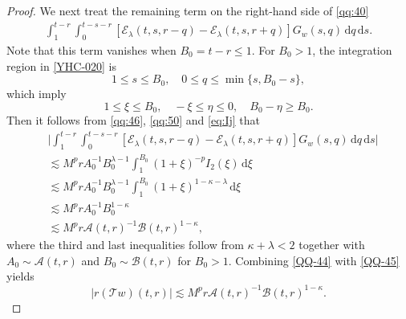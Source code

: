 \documentclass[10pt,a4paper]{amsart}
\newcommand{\Acal}{\mathcal A}
\newcommand{\Bcal}{\mathcal B}
\newcommand{\Ecal}{\mathcal E}
\newcommand{\Tcal}{\mathcal T}
\newcommand{\dd}{\,\mathrm{d}}
\begin{document}
\begin{proof}
We next treat the remaining term on the right-hand side of
\eqref{qq:40}
\begin{equation}\label{YHC-020}
\begin{aligned}
\int_1^{t-r}
\int_0^{t-s-r}
\left[
\Ecal_\lambda(t,s,r-q)
-
\Ecal_\lambda(t,s,r+q)
\right]
G_w(s,q)\dd q\dd s.
\end{aligned}
\end{equation}
Note that this term vanishes when $B_0=t-r\leq1$. For $B_0>1$, the
integration region in \eqref{YHC-020} is
\[
1\leq s\leq B_0,
\quad
0\leq q\leq\min\{s,B_0-s\},
\]
which  imply
\[
1\leq\xi\leq B_0,
\quad
-\xi\leq\eta\leq0,\quad B_0-\eta\geq B_0.
\]
Then it follows from \eqref{qq:46},
\eqref{qq:50} and \eqref{eq:Ij} that
\begin{equation}\label{QQ-45}
\begin{aligned}
&\big|
\int_1^{t-r}
\int_0^{t-s-r}
\left[
\Ecal_\lambda(t,s,r-q)
-
\Ecal_\lambda(t,s,r+q)
\right]
G_w(s,q)\dd q\dd s
\big|\\
&\lesssim
M^p rA_0^{-1}B_0^{\lambda-1}
\int_1^{B_0}
(1+\xi)^{-p}I_2(\xi)\dd\xi\\
&\lesssim
M^p rA_0^{-1}B_0^{\lambda-1}
\int_1^{B_0}
(1+\xi)^{1-\kappa-\lambda}\dd\xi\\
&\lesssim
M^p rA_0^{-1}B_0^{1-\kappa}\\
&\lesssim
M^p r
\Acal(t,r)^{-1}
\Bcal(t,r)^{1-\kappa},
\end{aligned}
\end{equation}
where the third and last inequalities follow from
$\kappa+\lambda<2$ together with
$A_0\sim\Acal(t,r)$ and $B_0\sim\Bcal(t,r)$ for $B_0>1$. Combining \eqref{QQ-44} with
\eqref{QQ-45} yields
\begin{equation}
\label{qq:51}
|r(\Tcal w)(t,r)|
\lesssim
M^p r
\Acal(t,r)^{-1}
\Bcal(t,r)^{1-\kappa}.
\end{equation}


\end{proof}
\end{document}
